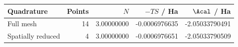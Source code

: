 \begin{tabular}{lrrrr}\toprule
Quadrature & Points & $N$ & $-TS$ / Ha & $\Acal$ / Ha\\\midrule
Full mesh & 14 & 3.00000000 & -0.0006976635 & -2.05033790491\\
Spatially reduced & 4 & 3.00000000 & -0.0006976651 & -2.05033790509\\
\bottomrule\end{tabular}
